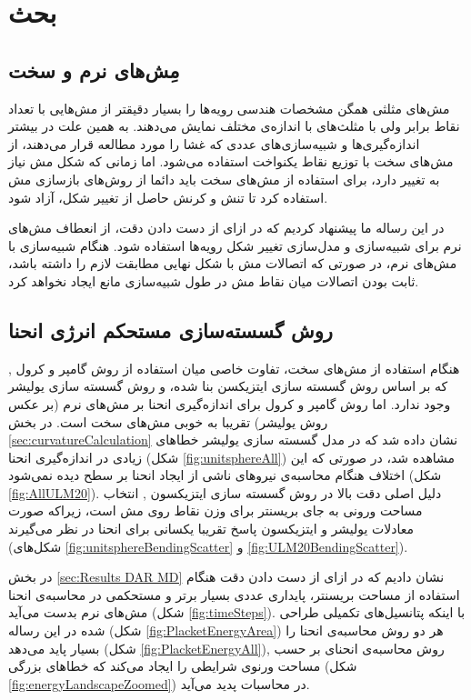 \setRL
\clearpage

\section{
بحث
}
\subsection{مِش‌های نرم و سخت}
مش‌های مثلثی همگن مشخصات هندسی رویه‌ها را بسیار دقیقتر از مش‌هایی با تعداد نقاط برابر ولی با مثلث‌‌های با اندازه‌ی مختلف نمایش می‌دهند. به همین علت در بیشتر اندازه‌گیری‌ها و شبیه‌سازی‌های عددی که غشا را مورد مطالعه قرار می‌دهند، از مش‌های سخت با توزیع نقاط یکنواخت استفاده می‌شود. اما زمانی‌ که شکل مش‌ نیاز به تغییر دارد، برای استفاده از مش‌های سخت باید دائما از روش‌های بازسازی مش استفاده کرد تا تنش و کرنش حاصل از تغییر شکل، آزاد شود.

در این رساله ما پیشنهاد کردیم که در ازای از دست دادن دقت، از انعطاف مش‌های نرم برای شبیه‌سازی و مدل‌سازی تغییر شکل‌ رویه‌ها استفاده شود. هنگام شبیه‌سازی با مش‌های نرم، در صورتی که اتصالات مش با شکل‌ نهایی مطابقت لازم را داشته باشد، ثابت بودن اتصالات میان نقاط مش در طول شبیه‌سازی مانع ایجاد نخواهد کرد.

\subsection{
روش گسسته‌سازی مستحکم انرژی انحنا
}
هنگام استفاده از مش‌های سخت، تفاوت خاصی میان استفاده از روش گامپر و کرول
\cite{gompper1996},
که بر اساس روش گسسته سازی ایتزیکسن 
\cite{Itzykson1986}
بنا شده، و روش گسسته سازی یولیشر
\cite{Julicher1996}
وجود ندارد. اما روش گامپر و کرول برای اندازه‌گیری انحنا بر مش‌های نرم (بر عکس روش یولیشر) تقریبا به خوبی مش‌های سخت است. در بخش 
\ref{sec:curvatureCalculation}
نشان داده شد که در مدل گسسته سازی یولیشر خطا‌های زیادی در اندازه‌گیری انحنا (شکل
\ref{fig:unitsphereAll})
مشاهده شد، در صورتی که این اختلاف هنگام محاسبه‌ی نیرو‌های ناشی از ایجاد انحنا بر سطح دیده نمی‌شود (شکل
\ref{fig:AllULM20}).
  دلیل اصلی دقت بالا در روش گسسته سازی ایتزیکسون
\cite{Itzykson1986},
انتخاب مساحت ورونی به جای بریسنتر برای وزن نقاط روی مش است، زیراکه صورت معادلات یولیشر و ایتزیکسون پاسخ تقریبا یکسانی برای انحنا در نظر می‌گیرند (شکل‌های
\ref{fig:unitsphereBendingScatter}
و
\ref{fig:ULM20BendingScatter}).

در بخش
\ref{sec:Results DAR MD}
نشان دادیم که در ازای از دست دادن دقت هنگام استفاده از مساحت بریسنتر، پایداری عددی بسیار برتر و مستحکمی در محاسبه‌ی انحنا مش‌های نرم بدست می‌آید (شکل
\ref{fig:timeSteps}).
با اینکه پتانسیل‌های تکمیلی طراحی شده در این رساله (شکل
\ref{fig:PlacketEnergyArea})
هر دو روش محاسبه‌ی انحنا را بسیار پاید می‌دهد (شکل
\ref{fig:PlacketEnergyAll}),
 روش محاسبه‌ی انحنای بر حسب مساحت ورنوی شرایطی را ایجاد می‌کند که خطا‌های بزرگی (شکل
\ref{fig:energyLandscapeZoomed})
 در محاسبات پدید می‌آید.

